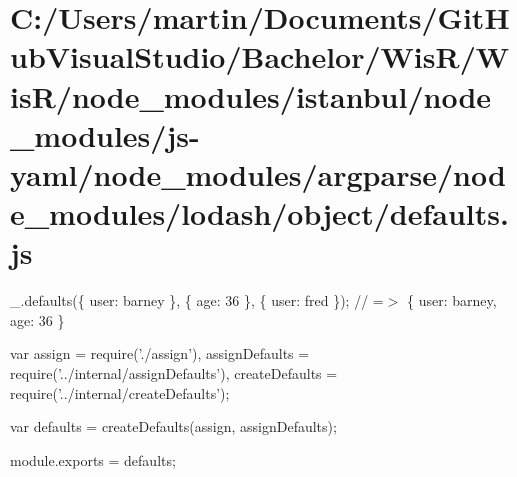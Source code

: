 \hypertarget{_c_1_2_users_2martin_2_documents_2_git_hub_visual_studio_2_bachelor_2_wis_r_2_wis_r_2node_module51b45e0b680fcf32f6d4c91ece01ea69}{}\section{C\+:/\+Users/martin/\+Documents/\+Git\+Hub\+Visual\+Studio/\+Bachelor/\+Wis\+R/\+Wis\+R/node\+\_\+modules/istanbul/node\+\_\+modules/js-\/yaml/node\+\_\+modules/argparse/node\+\_\+modules/lodash/object/defaults.\+js}
\+\_\+.\+defaults(\{ \textquotesingle{}user\textquotesingle{}\+: \textquotesingle{}barney\textquotesingle{} \}, \{ \textquotesingle{}age\textquotesingle{}\+: 36 \}, \{ \textquotesingle{}user\textquotesingle{}\+: \textquotesingle{}fred\textquotesingle{} \}); // =$>$ \{ \textquotesingle{}user\textquotesingle{}\+: \textquotesingle{}barney\textquotesingle{}, \textquotesingle{}age\textquotesingle{}\+: 36 \}


\begin{DoxyCodeInclude}
var assign = require(\textcolor{stringliteral}{'./assign'}),
    assignDefaults = require(\textcolor{stringliteral}{'../internal/assignDefaults'}),
    createDefaults = require(\textcolor{stringliteral}{'../internal/createDefaults'});

var defaults = createDefaults(assign, assignDefaults);

module.exports = defaults;
\end{DoxyCodeInclude}
 
